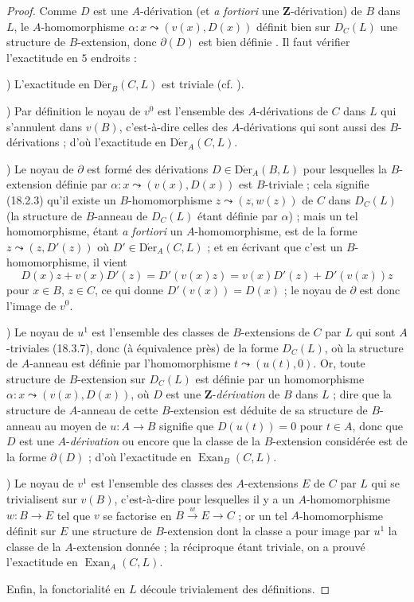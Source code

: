 \begin{proof}
Comme $D$ est une $A$-dérivation (et \emph{a fortiori} une
$\mathbf{Z}$-dérivation) de $B$ dans $L$, le $A$-homomorphisme
$\alpha:x\leadsto(v(x),D(x))$ définit bien sur $D_C(L)$ une structure de
$B$-extension, donc $\partial(D)$ est bien définie . Il
faut vérifier l'exactitude en $5$ endroits :

\medskip
{})\enspace
L'exactitude en $\operatorname{D\acute{e}r}_B(C,L)$ est triviale (cf.
).

\medskip
{})\enspace
Par définition  le noyau de $v^0$ est l'ensemble des
$A$-dérivations de $C$ dans $L$ qui s'annulent dans $v(B)$, c'est-à-dire
celles des $A$-dérivations qui sont aussi des $B$-dérivations
 ; d'où l'exactitude en $\operatorname{D\acute{e}r}_A(C,L)$.

\medskip
{})\enspace
Le noyau de $\partial$ est formé des dérivations
$D\in\operatorname{D\acute{e}r}_A(B,L)$ pour lesquelles la $B$-extension définie par
$\alpha:x\leadsto(v(x),D(x))$ est $B$-triviale ; cela signifie (18.2.3) qu'il
existe un $B$-homomorphisme $z\leadsto(z,w(z))$ de $C$ dans $D_C(L)$ (la
structure de $B$-anneau de $D_C(L)$ étant définie par $\alpha$) ; mais un tel
homomorphisme, étant \emph{a fortiori} un $A$-homomorphisme, est de la forme
$z\leadsto(z,D'(z))$ où $D'\in\operatorname{D\acute{e}r}_A(C,L)$
 ; et en écrivant que c'est un $B$-homomorphisme, il vient
\[
  D(x)z+v(x)D'(z)=D'(v(x)z)=v(x)D'(z)+D'(v(x))z
\]
pour $x\in B$, $z\in C$, ce qui donne $D'(v(x))=D(x)$ ; le noyau de
$\partial$ est donc l'image de $v^0$.

\medskip
{})\enspace
Le noyau de $u^1$ est l'ensemble des classes de $B$-extensions de $C$ par
$L$ qui sont $A$-triviales (18.3.7), donc (à équivalence près) de la forme
$D_C(L)$, où la structure de $A$-anneau est définie par l'homomorphisme
$t\leadsto(u(t),0)$. Or, toute structure de $B$-extension sur $D_C(L)$ est
définie par un homomorphisme $\alpha:x\leadsto(v(x),D(x))$, où $D$ est une
$\mathbf{Z}$-\emph{dérivation} de $B$ dans $L$  ; dire que la
structure de $A$-anneau de cette $B$-extension est déduite de sa structure de
$B$-anneau au moyen de $u:A\to B$ signifie que $D(u(t))=0$ pour $t\in A$,
donc que $D$ est une $A$-\emph{dérivation} ou encore que la classe de la $B$-extension
considérée est de la forme $\partial(D)$ ; d'où l'exactitude en
$\operatorname{Exan}_B(C,L)$.

\medskip
{})\enspace
Le noyau de $v^1$ est l'ensemble des classes des $A$-extensions $E$ de $C$
par $L$ qui se trivialisent sur $v(B)$, c'est-à-dire pour lesquelles il y a un
$A$-homomorphisme $w:B\to E$ tel que $v$ se factorise en
$B\xrightarrow{w}E\to C$ ; or un tel $A$-homomorphisme définit sur $E$ une
structure de $B$-extension dont la classe a pour image par $u^1$ la classe de
la $A$-extension donnée ; la réciproque étant triviale, on a prouvé
l'exactitude en $\operatorname{Exan}_A(C,L)$.

Enfin, la fonctorialité en $L$ découle trivialement des définitions.
\end{proof}


